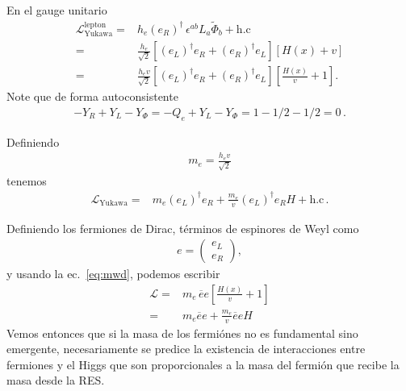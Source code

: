 \begin{frame}
En el gauge unitario
\begin{align}
  \label{eq:lyuklep}
  \mathcal{L}_{\text{Yukawa}}^{\text{lepton}}=& h_e \left( e_R \right)^{\dagger}\,\epsilon^{ab}L_a\widetilde{\Phi}_b+\text{h.c}\nonumber\\
=&\frac{h_e}{\sqrt{2}}\left[\left( e_L \right)^{\dagger}e_R+\left( e_R \right)^{\dagger}e_L\right]
\left[H(x)+v\right]\nonumber\\
=&\frac{h_ev}{\sqrt{2}}\left[\left( e_L \right)^{\dagger}e_R+\left( e_R \right)^{\dagger}e_L\right]
\left[\frac{H(x)}{v}+1\right].
\end{align}
Note que de forma autoconsistente
\begin{align}
 -Y_R+ Y_L-Y_{\Phi}= -Q_e+ Y_L-Y_{\Phi}=1-1/2-1/2=0\,.
\end{align}


Definiendo
\begin{align}
  m_e=\frac{h_ev}{\sqrt{2}}
\end{align}
tenemos
\begin{align}
\label{eq:lyuklr}
  \mathcal{L}_{\text{Yukawa}}=&m_e (e_L)^{\dagger}e_R
+\frac{m_e}{v}  (e_L)^{\dagger}e_RH
+\text{h.c}\,.
\end{align}

Definiendo los fermiones de Dirac, términos de espinores de Weyl como
\begin{align}
  e=
  \begin{pmatrix}
    e_L\\
    e_R
  \end{pmatrix},
\end{align}
y usando la ec.~\eqref{eq:mwd}, podemos escribir
\begin{align*}
\mathcal{L}=&m_e\,\overline{e}e
\left[\frac{H(x)}{v}+1\right] \nonumber\\
=&m_e\overline{e}e+
  \frac{m_e}{v}\overline{e}e H
\end{align*}
Vemos entonces que si la masa de los fermiónes no es fundamental sino
emergente, necesariamente se predice la existencia de interacciones
entre fermiones y el Higgs que son proporcionales a la masa del fermión
que recibe la masa desde la RES.
\end{frame}

